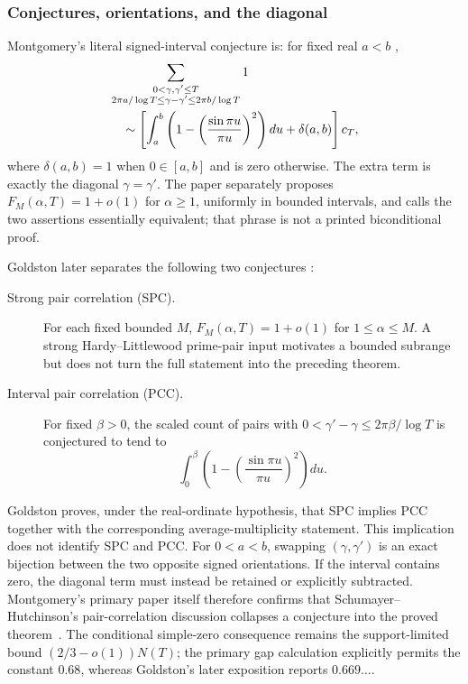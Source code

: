 \subsubsection{Conjectures, orientations, and the diagonal}

Montgomery's literal signed-interval conjecture is: for fixed real $a<b$
\cite[pp.~183--184, eqs.~(11)--(15)]{montgomery1973},
\begin{align}
 &\sum_{\substack{0<\gamma,\gamma'\leq T\\
  2\pi a/\log T\leq\gamma-\gamma'\leq2\pi b/\log T}}1 \notag\\
 &\quad\sim\left[
 \int_a^b\left(1-\left(\frac{\sin\pi u}{\pi u}\right)^2\right)du
 +\delta(a,b)\right]c_T,
 \label{eq:montgomery-signed-PCC}
\end{align}
where $\delta(a,b)=1$ when $0\in[a,b]$ and is zero otherwise.  The extra term is
exactly the diagonal $\gamma=\gamma'$.  The paper separately proposes
$F_M(\alpha,T)=1+o(1)$ for $\alpha\geq1$, uniformly in bounded intervals, and calls
the two assertions essentially equivalent; that phrase is not a printed biconditional proof.

Goldston later separates the following two conjectures
\cite[Sec.~6, eqs.~(6.6)--(6.9)]{goldston2004}:
\begin{description}
  \item[Strong pair correlation (SPC).]
  For each fixed bounded $M$,
  $F_M(\alpha,T)=1+o(1)$ for $1\leq\alpha\leq M$.
  A strong Hardy--Littlewood prime-pair input motivates a bounded subrange but does not turn
  the full statement into the preceding theorem.
  \item[Interval pair correlation (PCC).]
  For fixed $\beta>0$, the scaled count of pairs with
  $0<\gamma'-\gamma\leq2\pi\beta/\log T$ is conjectured to tend to
  \begin{equation}
    \int_0^\beta\left(1-\left(\frac{\sin\pi u}{\pi u}\right)^2\right)du.
    \label{eq:PCC}
  \end{equation}
\end{description}
Goldston proves, under the real-ordinate hypothesis, that SPC implies PCC together with the
corresponding average-multiplicity statement.  This implication does not identify SPC and
PCC.  For $0<a<b$, swapping $(\gamma,\gamma')$ is an exact bijection between the two
opposite signed orientations.  If the interval contains zero, the diagonal term must instead
be retained or explicitly subtracted.  Montgomery's primary paper itself therefore confirms
that Schumayer--Hutchinson's pair-correlation discussion collapses a conjecture into the
proved theorem~\cite[pair-correlation discussion]{schumayerHutchinson2011}.
The conditional simple-zero consequence remains the support-limited bound
$(2/3-o(1))N(T)$; the primary gap calculation explicitly permits the constant $0.68$,
whereas Goldston's later exposition reports $0.669\ldots$.

